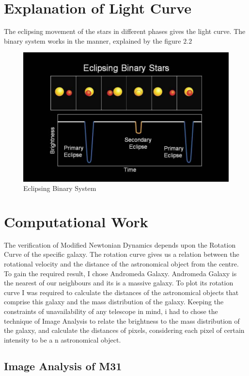 \section*{Explanation of Light Curve}

 The eclipsing movement of the stars in different phases gives the light curve. The binary system works in the manner, explained by the figure $2.2$ 
\cite{sys}
\begin{figure} [h]
\centering
\includegraphics[scale=0.5]{Light}
\caption{Eclipsing Binary System}
\end{figure}

\section{Computational Work}
The verification of Modified Newtonian Dynamics depends upon the Rotation Curve of the specific galaxy. The rotation curve gives us a relation between the rotational velocity and the distance of the astronomical object from the centre. To gain the required result, I chose Andromeda Galaxy. Andromeda Galaxy is the nearest of our neighbours and its is a massive galaxy. To plot its rotation curve I was required to calculate the distances of the astronomical objects that comprise this galaxy and the mass distribution of the galaxy. Keeping the constraints of unavailability of any telescope in mind, i had to chose the technique of Image Analysis to relate the brightness to the mass distribution of the galaxy, and calculate the distances of pixels, considering each pixel of certain intensity to be a n astronomical object.

\subsection{Image Analysis of M31}

